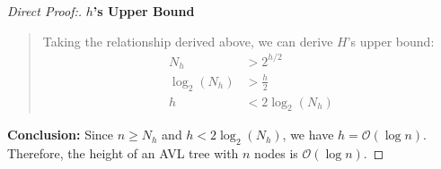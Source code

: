 \documentclass{article}
\begin{document}
\begin{proof}[Direct Proof:]
\textbf{$h$'s Upper Bound}
\begin{quote}
    
Taking the relationship derived above, we can derive $H$'s upper bound:
\begin{align*}
    N_h &> 2^{h/2}\\
    \log_2(N_h) &> \frac{h}{2}\\
    h &< 2\log_2(N_h)
\end{align*}
\end{quote}

\textbf{Conclusion:}
Since $n \ge N_h$ and $h < 2\log_2(N_h)$, we have $h = \mathcal{O}(\log n)$. Therefore, the height of an AVL tree with $n$ nodes is $\mathcal{O}(\log n)$.
\end{proof}
\end{document}
